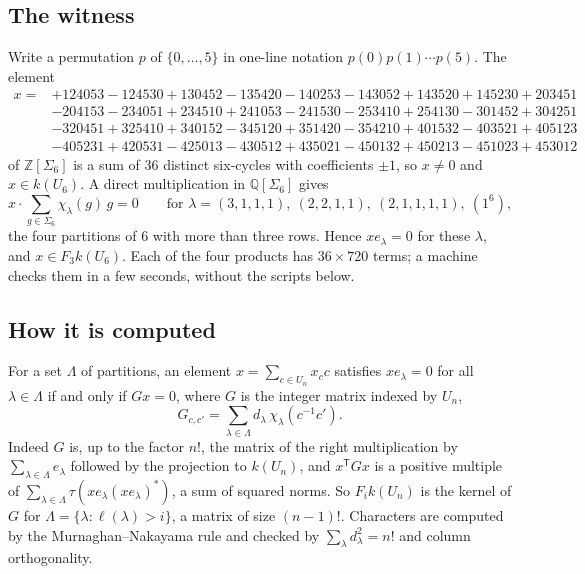 \documentclass[11pt,a4paper]{amsart}
\theoremstyle{definition}
\theoremstyle{remark}
\newcommand{\Q}{\mathbb Q}
\begin{document}
\subsection*{The witness}
Write a permutation $p$ of $\{0, \dots, 5\}$ in one-line notation $p(0)p(1)\cdots p(5)$. The element
\[
\begin{aligned}
x = {}&{+}124053 - 124530 + 130452 - 135420 - 140253 - 143052 + 143520 + 145230 + 203451\\
&{-}204153 - 234051 + 234510 + 241053 - 241530 - 253410 + 254130 - 301452 + 304251\\
&{-}320451 + 325410 + 340152 - 345120 + 351420 - 354210 + 401532 - 403521 + 405123\\
&{-}405231 + 420531 - 425013 - 430512 + 435021 - 450132 + 450213 - 451023 + 453012
\end{aligned}
\]
of $\mathbb Z[\Sigma_6]$ is a sum of $36$ distinct six-cycles with coefficients $\pm 1$, so $x \ne 0$ and $x \in k(U_6)$. A direct multiplication in $\Q[\Sigma_6]$ gives
\[
x \cdot \sum_{g \in \Sigma_6} \chi_\lambda(g)\, g = 0 \qquad \text{for } \lambda = (3,1,1,1),\ (2,2,1,1),\ (2,1,1,1,1),\ (1^6),
\]
the four partitions of $6$ with more than three rows. Hence $x e_\lambda = 0$ for these $\lambda$, and $x \in F_3 k(U_6)$. Each of the four products has $36 \times 720$ terms; a machine checks them in a few seconds, without the scripts below.

\subsection*{How it is computed}
For a set $\Lambda$ of partitions, an element $x = \sum_{c \in U_n} x_c c$ satisfies $x e_\lambda = 0$ for all $\lambda \in \Lambda$ if and only if $Gx = 0$, where $G$ is the integer matrix indexed by $U_n$,
\[
G_{c, c'} = \sum_{\lambda \in \Lambda} d_\lambda\, \chi_\lambda(c^{-1}c') .
\]
Indeed $G$ is, up to the factor $n!$, the matrix of the right multiplication by $\sum_{\lambda \in \Lambda} e_\lambda$ followed by the projection to $k(U_n)$, and $x^{\mathsf T} G x$ is a positive multiple of $\sum_{\lambda \in \Lambda} \tau(x e_\lambda (x e_\lambda)^*)$, a sum of squared norms. So $F_i k(U_n)$ is the kernel of $G$ for $\Lambda = \{\lambda : \ell(\lambda) > i\}$, a matrix of size $(n-1)!$. Characters are computed by the Murnaghan--Nakayama rule and checked by $\sum_\lambda d_\lambda^2 = n!$ and column orthogonality.
\end{document}

